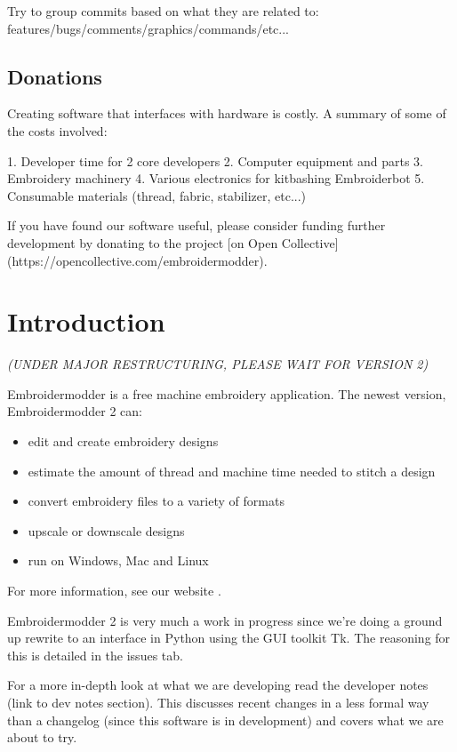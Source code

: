 \documentclass{report}
\begin{document}
Try to group commits based on what they are related to: features/bugs/comments/graphics/commands/etc...

\section{Donations}

Creating software that interfaces with hardware is costly. A summary of some of the costs involved:

1. Developer time for 2 core developers
2. Computer equipment and parts
3. Embroidery machinery
4. Various electronics for kitbashing Embroiderbot
5. Consumable materials (thread, fabric, stabilizer, etc...)

If you have found our software useful, please consider funding further development by donating to the project [on Open Collective](https://opencollective.com/embroidermodder).

\chapter{Introduction}

\emph{(UNDER MAJOR RESTRUCTURING, PLEASE WAIT FOR VERSION 2)}

Embroidermodder is a free machine embroidery application.
The newest version, Embroidermodder 2 can:

\begin{itemize}
\item edit and create embroidery designs
\item estimate the amount of thread and machine time needed to stitch a design
\item convert embroidery files to a variety of formats
\item upscale or downscale designs
\item run on Windows, Mac and Linux
\end{itemize}

For more information, see our website \cite{thewebsite}.

Embroidermodder 2 is very much a work in progress since we're doing a ground up rewrite to an interface in Python using the GUI toolkit Tk. The reasoning for this is detailed in the issues tab.

For a more in-depth look at what we are developing read the developer notes (link to dev notes section). This discusses recent changes in a less formal way than a changelog (since this software is in development) and covers what we are about to try.
\end{document}

